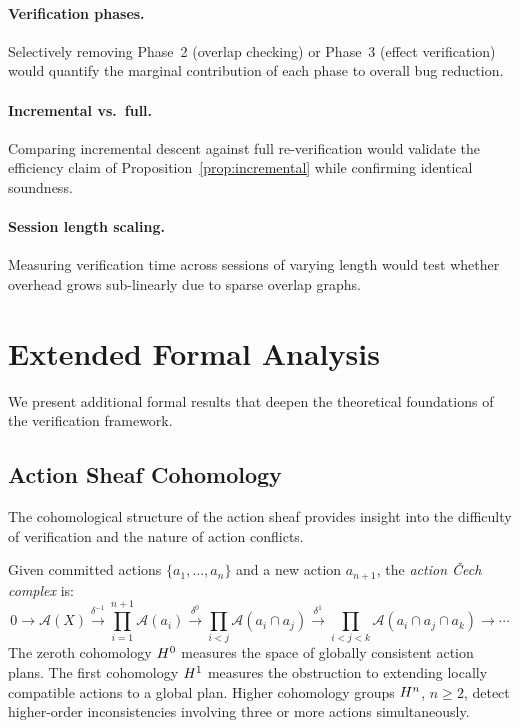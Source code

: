 \documentclass[11pt]{article}
\newcommand{\ActionSheaf}{\mathscr{A}}
\begin{document}
\paragraph{Verification phases.}
Selectively removing Phase~2 (overlap checking) or Phase~3 (effect
verification) would quantify the marginal contribution of each phase
to overall bug reduction.

\paragraph{Incremental vs.\ full.}
Comparing incremental descent against full re-verification would
validate the efficiency claim of Proposition~\ref{prop:incremental}
while confirming identical soundness.

\paragraph{Session length scaling.}
Measuring verification time across sessions of varying length would
test whether overhead grows sub-linearly due to sparse overlap graphs.


\section{Extended Formal Analysis}\label{sec:extended-formal}

We present additional formal results that deepen the theoretical
foundations of the verification framework.

\subsection{Action Sheaf Cohomology}\label{subsec:action-cohomology}

The cohomological structure of the action sheaf provides insight into
the difficulty of verification and the nature of action conflicts.

\begin{definition}\label{def:action-cech}
Given committed actions $\{a_1, \ldots, a_n\}$ and a new action
$a_{n+1}$, the \emph{action \v{C}ech complex} is:
\[
  0 \to \ActionSheaf(X) \xrightarrow{\delta^{-1}}
  \prod_{i=1}^{n+1} \ActionSheaf(a_i) \xrightarrow{\delta^0}
  \prod_{i < j} \ActionSheaf(a_i \cap a_j) \xrightarrow{\delta^1}
  \prod_{i < j < k} \ActionSheaf(a_i \cap a_j \cap a_k) \to \cdots
\]
The zeroth cohomology $H^{0}$ measures the space of globally
consistent action plans.  The first cohomology $H^{1}$ measures
the obstruction to extending locally compatible actions to a global
plan.  Higher cohomology groups $H^{n}$, $n \geq 2$, detect
higher-order inconsistencies involving three or more actions
simultaneously.
\end{definition}
\end{document}
